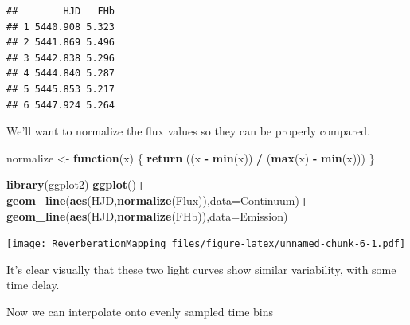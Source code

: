 \documentclass[]{article}
\newenvironment{Shaded}{\begin{snugshade}}{\end{snugshade}}
\newcommand{\ControlFlowTok}[1]{\textcolor[rgb]{0.13,0.29,0.53}{\textbf{#1}}}
\newcommand{\DataTypeTok}[1]{\textcolor[rgb]{0.13,0.29,0.53}{#1}}
\newcommand{\KeywordTok}[1]{\textcolor[rgb]{0.13,0.29,0.53}{\textbf{#1}}}
\newcommand{\NormalTok}[1]{#1}
\newcommand{\OperatorTok}[1]{\textcolor[rgb]{0.81,0.36,0.00}{\textbf{#1}}}
\newcommand{\StringTok}[1]{\textcolor[rgb]{0.31,0.60,0.02}{#1}}
\begin{document}
\begin{verbatim}
##        HJD   FHb
## 1 5440.908 5.323
## 2 5441.869 5.496
## 3 5442.838 5.296
## 4 5444.840 5.287
## 5 5445.853 5.217
## 6 5447.924 5.264
\end{verbatim}

We'll want to normalize the flux values so they can be properly
compared.

\begin{Shaded}
\begin{Highlighting}[]
\NormalTok{normalize <-}\StringTok{ }\ControlFlowTok{function}\NormalTok{(x) \{}
    \KeywordTok{return}\NormalTok{ ((x }\OperatorTok{-}\StringTok{ }\KeywordTok{min}\NormalTok{(x)) }\OperatorTok{/}\StringTok{ }\NormalTok{(}\KeywordTok{max}\NormalTok{(x) }\OperatorTok{-}\StringTok{ }\KeywordTok{min}\NormalTok{(x)))}
\NormalTok{  \}}
\end{Highlighting}
\end{Shaded}

\begin{Shaded}
\begin{Highlighting}[]
\KeywordTok{library}\NormalTok{(ggplot2)}
\KeywordTok{ggplot}\NormalTok{()}\OperatorTok{+}
\StringTok{  }\KeywordTok{geom_line}\NormalTok{(}\KeywordTok{aes}\NormalTok{(HJD,}\KeywordTok{normalize}\NormalTok{(Flux)),}\DataTypeTok{data=}\NormalTok{Continuum)}\OperatorTok{+}
\StringTok{  }\KeywordTok{geom_line}\NormalTok{(}\KeywordTok{aes}\NormalTok{(HJD,}\KeywordTok{normalize}\NormalTok{(FHb)),}\DataTypeTok{data=}\NormalTok{Emission)}
\end{Highlighting}
\end{Shaded}

\texttt{[image: ReverberationMapping\_files/figure-latex/unnamed-chunk-6-1.pdf]}

It's clear visually that these two light curves show similar
variability, with some time delay.

Now we can interpolate onto evenly sampled time bins
\end{document}
